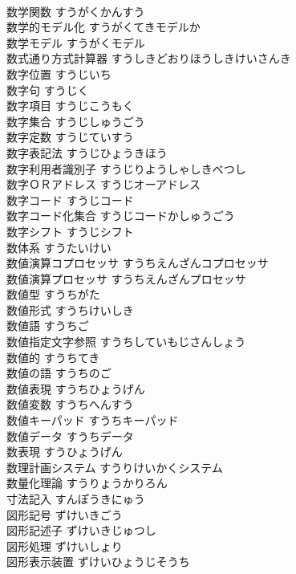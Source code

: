 \documentclass[8pt]{extreport}
\begin{document}
\begin{CJK}{UTF8}{min}
\\	数学関数	すうがくかんすう	
\\	数学的モデル化	すうがくてきモデルか	
\\	数学モデル	すうがくモデル	
\\	数式通り方式計算器	すうしきどおりほうしきけいさんき	
\\	数字位置	すうじいち	
\\	数字句	すうじく	
\\	数字項目	すうじこうもく	
\\	数字集合	すうじしゅうごう	
\\	数字定数	すうじていすう	
\\	数字表記法	すうじひょうきほう	
\\	数字利用者識別子	すうじりようしゃしきべつし	
\\	数字ＯＲアドレス	すうじオーアドレス	
\\	数字コード	すうじコード	
\\	数字コード化集合	すうじコードかしゅうごう	
\\	数字シフト	すうじシフト	
\\	数体系	すうたいけい	
\\	数値演算コプロセッサ	すうちえんざんコプロセッサ	
\\	数値演算プロセッサ	すうちえんざんプロセッサ	
\\	数値型	すうちがた	
\\	数値形式	すうちけいしき	
\\	数値語	すうちご	
\\	数値指定文字参照	すうちしていもじさんしょう	
\\	数値的	すうちてき	
\\	数値の語	すうちのご	
\\	数値表現	すうちひょうげん	
\\	数値変数	すうちへんすう	
\\	数値キーパッド	すうちキーパッド	
\\	数値データ	すうちデータ	
\\	数表現	すうひょうげん	
\\	数理計画システム	すうりけいかくシステム	
\\	数量化理論	すうりょうかりろん	
\\	寸法記入	すんぽうきにゅう	
\\	図形記号	ずけいきごう	
\\	図形記述子	ずけいきじゅつし	
\\	図形処理	ずけいしょり	
\\	図形表示装置	ずけいひょうじそうち	

\end{CJK}
\end{document}
